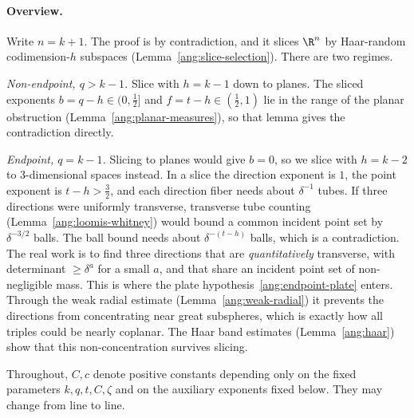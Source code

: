 \paragraph{Overview.} Write $n=k+1$. The proof is by contradiction, and it slices $\R^{n}$ by Haar-random codimension-$h$ subspaces (Lemma~\ref{ang:slice-selection}). There are two regimes.

\emph{Non-endpoint, $q>k-1$.} Slice with $h=k-1$ down to planes. The sliced exponents $b=q-h\in(0,\tfrac12]$ and $f=t-h\in(\tfrac12,1)$ lie in the range of the planar obstruction (Lemma~\ref{ang:planar-measures}), so that lemma gives the contradiction directly.

\emph{Endpoint, $q=k-1$.} Slicing to planes would give $b=0$, so we slice with $h=k-2$ to $3$-dimensional spaces instead. In a slice the direction exponent is $1$, the point exponent is $t-h>\tfrac32$, and each direction fiber needs about $\delta^{-1}$ tubes. If three directions were uniformly transverse, transverse tube counting (Lemma~\ref{ang:loomis-whitney}) would bound a common incident point set by $\delta^{-3/2}$ balls. The ball bound needs about $\delta^{-(t-h)}$ balls, which is a contradiction. The real work is to find three directions that are \emph{quantitatively} transverse, with determinant $\ge\delta^a$ for a small $a$, and that share an incident point set of non-negligible mass. This is where the plate hypothesis~\eqref{ang:endpoint-plate} enters. Through the weak radial estimate (Lemma~\ref{ang:weak-radial}) it prevents the directions from concentrating near great subspheres, which is exactly how all triples could be nearly coplanar. The Haar band estimates (Lemma~\ref{ang:haar}) show that this non-concentration survives slicing.

Throughout, $C,c$ denote positive constants depending only on the fixed parameters $k,q,t,C,\zeta$ and on the auxiliary exponents fixed below. They may change from line to line.

